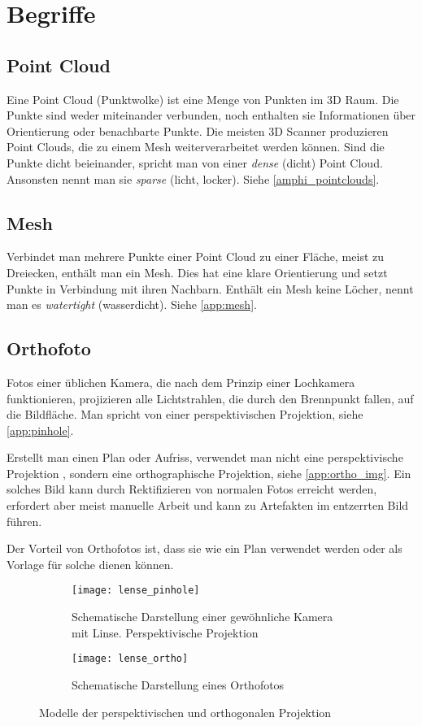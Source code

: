 \chapter{Begriffe}
		\section{Point Cloud}\label{app:point_cloud}
			Eine Point Cloud (Punktwolke) ist eine Menge von Punkten im 3D Raum. Die Punkte sind weder miteinander verbunden, noch enthalten sie Informationen über Orientierung oder benachbarte Punkte. Die meisten 3D Scanner produzieren Point Clouds, die zu einem Mesh weiterverarbeitet werden können.
			Sind die Punkte dicht beieinander, spricht man von einer \emph{dense} (dicht) Point Cloud. Ansonsten nennt man sie \emph{sparse} (licht, locker).
			Siehe \autoref{amphi_pointclouds}.
		
		\section{Mesh}\label{app:mesh}
			Verbindet man mehrere Punkte einer Point Cloud zu einer Fläche, meist zu Dreiecken, enthält man ein Mesh. Dies hat eine klare Orientierung und setzt Punkte in Verbindung mit ihren Nachbarn. Enthält ein Mesh keine Löcher, nennt man es \emph{watertight} (wasserdicht).
			Siehe \autoref{app:mesh}.
		
		\section{Orthofoto} \label{app:orthofoto}
			Fotos einer üblichen Kamera, die nach dem Prinzip einer Lochkamera funktionieren, projizieren alle Lichtstrahlen, die durch den Brennpunkt fallen, auf die Bildfläche. Man spricht von einer perspektivischen Projektion, siehe \autoref{app:pinhole}.
			
			Erstellt man einen Plan oder Aufriss, verwendet man nicht eine perspektivische Projektion , sondern eine orthographische Projektion, siehe \autoref{app:ortho_img}. Ein solches Bild kann durch Rektifizieren von normalen Fotos erreicht werden, erfordert aber meist manuelle Arbeit und kann zu Artefakten im entzerrten Bild führen.
			
			Der Vorteil von Orthofotos ist, dass sie wie ein Plan verwendet werden oder als Vorlage für solche dienen können.
			
			\begin{figure}
				\begin{subfigure}{0.5\linewidth}
					\texttt{[image: lense\_pinhole]}
					\caption{Schematische Darstellung einer gewöhnliche Kamera mit Linse. Perspektivische Projektion}
					\label{app:pinhole}
				\end{subfigure}
				\hspace{0.2\linewidth}
				\begin{subfigure}{0.5\linewidth}
					\texttt{[image: lense\_ortho]}
					\caption{Schematische Darstellung eines Orthofotos}
					\label{app:ortho_img}
				\end{subfigure}
				\caption{Modelle der perspektivischen und orthogonalen Projektion}
			\end{figure}

